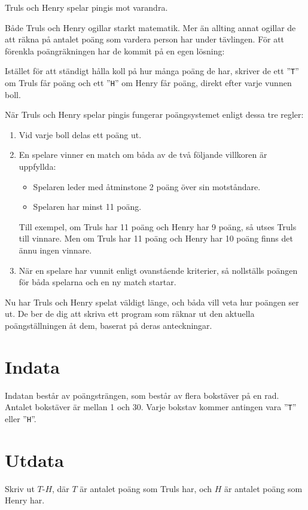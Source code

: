 \noindent

Truls och Henry spelar pingis mot varandra.

Både Truls och Henry ogillar starkt matematik.
Mer än allting annat ogillar de att räkna på antalet poäng som vardera person har under tävlingen.
För att förenkla poängräkningen har de kommit på en egen lösning:

Istället för att ständigt hålla koll på hur många poäng de har, skriver de 
ett ''\texttt{T}'' om Truls får poäng och ett ''\texttt{H}'' om Henry
får poäng, direkt efter varje vunnen boll.

När Truls och Henry spelar pingis fungerar poängsystemet enligt dessa tre regler:
\begin{enumerate}
  \item Vid varje boll delas ett poäng ut.
  \item En spelare vinner en match om båda av de två följande villkoren är uppfyllda:
  \begin{itemize}
    \item Spelaren leder med åtminstone 2 poäng över sin motståndare.
    \item Spelaren har minst 11 poäng.
  \end{itemize}
  Till exempel, om Truls har 11 poäng och Henry har 9 poäng, så utses Truls till vinnare. Men om Truls
  har 11 poäng och Henry har 10 poäng finns det ännu ingen vinnare.

  \item När en spelare har vunnit enligt ovanstående kriterier, så nollställs poängen för båda spelarna
  och en ny match startar.
\end{enumerate}

Nu har Truls och Henry spelat väldigt länge, och båda vill veta hur poängen ser ut.
De ber de dig att skriva ett program som
räknar ut den aktuella poängställningen åt dem, baserat på deras anteckningar.


\section*{Indata}
Indatan består av poängsträngen, som består av flera bokstäver på en rad. Antalet bokstäver är mellan 1 och 30. 
Varje bokstav kommer antingen vara ''\texttt{T}'' eller ''\texttt{H}''.

\section*{Utdata}
Skriv ut $T$-$H$, där $T$ är antalet poäng som Truls har, och $H$ är antalet poäng som Henry har.


